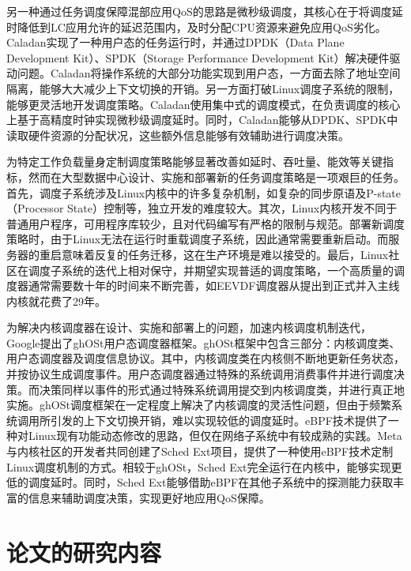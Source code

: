 另一种通过任务调度保障混部应用QoS的思路是微秒级调度\citep{ousterhout2019shenango,fried2020caladan,prekas2017zygos}，其核心在于将调度延时降低到LC应用允许的延迟范围内，及时分配CPU资源来避免应用QoS劣化。Caladan\citep{fried2020caladan}实现了一种用户态的任务运行时，并通过DPDK（Data Plane Development Kit）、SPDK（Storage Performance Development Kit）解决硬件驱动问题。Caladan将操作系统的大部分功能实现到用户态，一方面去除了地址空间隔离，能够大大减少上下文切换的开销。另一方面打破Linux调度子系统的限制，能够更灵活地开发调度策略。Caladan使用集中式的调度模式，在负责调度的核心上基于高精度时钟实现微秒级调度延时。同时，Caladan能够从DPDK、SPDK中读取硬件资源的分配状况，这些额外信息能够有效辅助进行调度决策。

为特定工作负载量身定制调度策略能够显著改善如延时、吞吐量、能效等关键指标，然而在大型数据中心设计、实施和部署新的任务调度策略是一项艰巨的任务\citep{humphries2021ghost}。首先，调度子系统涉及Linux内核中的许多复杂机制，如复杂的同步原语及P-state（Processor State）控制等，独立开发的难度较大。其次，Linux内核开发不同于普通用户程序，可用程序库较少，且对代码编写有严格的限制与规范。部署新调度策略时，由于Linux无法在运行时重载调度子系统，因此通常需要重新启动。而服务器的重启意味着反复的任务迁移，这在生产环境是难以接受的。最后，Linux社区在调度子系统的迭代上相对保守，并期望实现普适的调度策略，一个高质量的调度器通常需要数十年的时间来不断完善\citep{agache2020firecracker}，如EEVDF调度器从提出到正式并入主线内核就花费了29年。

为解决内核调度器在设计、实施和部署上的问题，加速内核调度机制迭代，Google提出了ghOSt\citep{humphries2021ghost}用户态调度器框架。ghOSt框架中包含三部分：内核调度类、用户态调度器及调度信息协议。其中，内核调度类在内核侧不断地更新任务状态，并按协议生成调度事件。用户态调度器通过特殊的系统调用消费事件并进行调度决策。而决策同样以事件的形式通过特殊系统调用提交到内核调度类，并进行真正地实施。ghOSt调度框架在一定程度上解决了内核调度的灵活性问题，但由于频繁系统调用所引发的上下文切换开销，难以实现较低的调度延时。eBPF技术提供了一种对Linux现有功能动态修改的思路，但仅在网络子系统中有较成熟的实践。Meta与内核社区的开发者共同创建了Sched Ext项目，提供了一种使用eBPF技术定制Linux调度机制的方式。相较于ghOSt，Sched Ext完全运行在内核中，能够实现更低的调度延时。同时，Sched Ext能够借助eBPF在其他子系统中的探测能力获取丰富的信息来辅助调度决策，实现更好地应用QoS保障。

\section{论文的研究内容}

